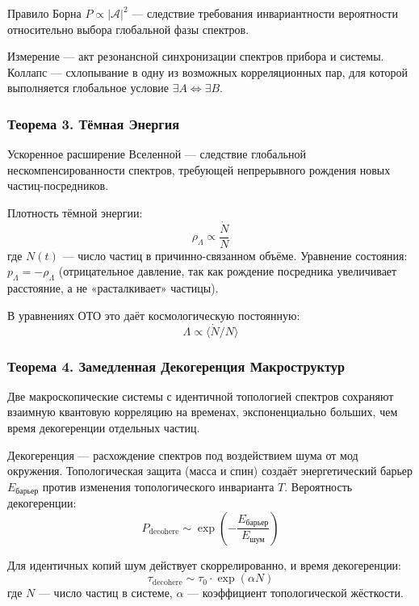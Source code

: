 \documentclass[12pt,a4paper]{article}
\begin{document}
Правило Борна $P \propto |\mathcal{A}|^2$ --- следствие требования инвариантности вероятности относительно выбора глобальной фазы спектров.

Измерение --- акт резонансной синхронизации спектров прибора и системы. Коллапс --- схлопывание в одну из возможных корреляционных пар, для которой выполняется глобальное условие $\exists A \iff \exists B$.

\subsubsection{Теорема 3. Тёмная Энергия}
Ускоренное расширение Вселенной --- следствие глобальной нескомпенсированности спектров, требующей непрерывного рождения новых частиц-посредников.

Плотность тёмной энергии:
\begin{equation}
    \rho_\Lambda \propto \frac{\dot{N}}{N}
\end{equation}
где $N(t)$ --- число частиц в причинно-связанном объёме. Уравнение состояния: $p_\Lambda = -\rho_\Lambda$ (отрицательное давление, так как рождение посредника увеличивает расстояние, а не «расталкивает» частицы).

В уравнениях ОТО это даёт космологическую постоянную:
\begin{equation}
    \Lambda \propto \langle \dot{N}/N \rangle
\end{equation}

\subsubsection{Теорема 4. Замедленная Декогеренция Макроструктур}
Две макроскопические системы с идентичной топологией спектров сохраняют взаимную квантовую корреляцию на временах, экспоненциально больших, чем время декогеренции отдельных частиц.

Декогеренция --- расхождение спектров под воздействием шума от мод окружения. Топологическая защита (масса и спин) создаёт энергетический барьер $E_{\text{барьер}}$ против изменения топологического инварианта $T$. Вероятность декогеренции:
\begin{equation}
    P_{\text{decohere}} \sim \exp\left(-\frac{E_{\text{барьер}}}{E_{\text{шум}}}\right)
\end{equation}

Для идентичных копий шум действует скоррелированно, и время декогеренции:
\begin{equation}
    \tau_{\text{decohere}} \sim \tau_0 \cdot \exp(\alpha N)
\end{equation}
где $N$ --- число частиц в системе, $\alpha$ --- коэффициент топологической жёсткости.
\end{document}
